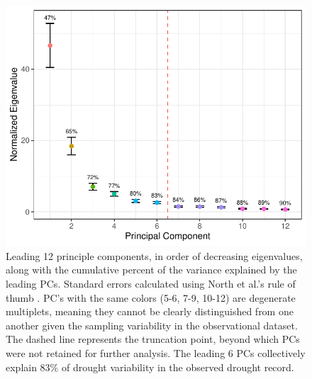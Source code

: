 \documentclass[11pt]{wlscirep}
\begin{document}
\begin{figure}[!ht]
\centering
\includegraphics[width=.8\linewidth]{figures/scree.pdf}
\caption{Leading 12 principle components, in order of decreasing eigenvalues, along with the cumulative percent of the variance explained by the leading PCs. Standard errors calculated using North et al.'s rule of thumb \cite{North1982}. PC's with the same colors (5-6, 7-9, 10-12) are degenerate multiplets, meaning they cannot be clearly distinguished from one another given the sampling variability in the observational dataset. The dashed line represents the truncation point, beyond which PCs were not retained for further analysis. The leading 6 PCs collectively explain 83\% of drought variability in the observed drought record.}
\label{fig:scree}
\end{figure}
\end{document}
